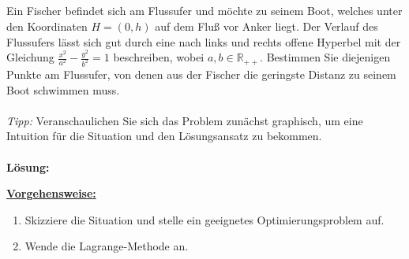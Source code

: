 \newpage
\subsection*{}
Ein Fischer befindet sich am Flussufer und möchte zu seinem Boot, welches unter den Koordinaten $ H = (0,h) $ auf dem Fluß vor Anker liegt. Der Verlauf des Flussufers lässt sich gut durch eine nach links und rechts offene Hyperbel mit der Gleichung
$ \frac{x^2}{a^2} - \frac{y^2}{b^2} = 1 $ beschreiben, wobei $ a,b \in \mathbb{R}_{++} $.
Bestimmen Sie diejenigen Punkte am Flussufer, von denen aus der Fischer
die geringste Distanz zu seinem Boot schwimmen muss.\\
\\
\textit{Tipp:} Veranschaulichen Sie sich das Problem zunächst graphisch, um eine Intuition für die Situation und den Lösungsansatz zu bekommen.
\\ \\
\textbf{Lösung:}
\begin{mdframed}
\underline{\textbf{Vorgehensweise:}}
\begin{enumerate}
\item Skizziere die Situation und stelle ein geeignetes Optimierungsproblem auf.
\item Wende die Lagrange-Methode an.
\end{enumerate}
\end{mdframed}

